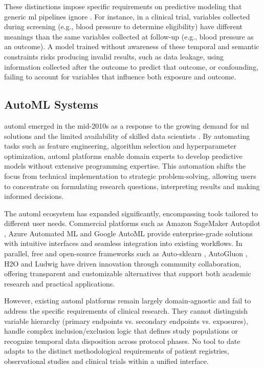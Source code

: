 \documentclass[conference,twocolumn]{IEEEtran}
\begin{document}
These distinctions impose specific requirements on predictive modeling that generic \gls{ml} pipelines ignore \cite{gao2025confounder}. For instance, in a clinical trial, variables collected during screening (e.g., blood pressure to determine eligibility) have different meanings than the same variables collected at follow-up (e.g., blood pressure as an outcome). A model trained without awareness of these temporal and semantic constraints risks producing invalid results, such as data leakage, using information collected after the outcome to predict that outcome, or confounding, failing to account for variables that influence both exposure and outcome.

\subsection{AutoML Systems}  
\label{subsec:automl_systems}  
  
\gls{automl} emerged in the mid-2010s as a response to the growing demand for   
\gls{ml} solutions and the limited availability of skilled data scientists   
\cite{he2021automl}. By automating tasks such as feature engineering, algorithm   
selection and hyperparameter optimization, \gls{automl} platforms enable domain   
experts to develop predictive models without extensive programming expertise. This   
automation shifts the focus from technical implementation to strategic   
problem-solving, allowing users to concentrate on formulating research questions,   
interpreting results and making informed decisions.

The \gls{automl} ecosystem has expanded significantly, encompassing tools tailored   
to different user needs. Commercial platforms such as Amazon SageMaker Autopilot   
\cite{AmazonSagemakerAutopilot}, Azure Automated ML \cite{AzureAutomatedML} and   
Google AutoML \cite{GoogleAutoML} provide enterprise-grade solutions with intuitive   
interfaces and seamless integration into existing workflows. In parallel, free and open-source frameworks such as Auto-sklearn \cite{autosklearn}, AutoGluon \cite{autogluon}, H2O \cite{h2o3} and Ludwig \cite{ludwig} have driven innovation through community collaboration, offering transparent and customizable alternatives that support both academic research and practical applications.  
  
However, existing \gls{automl} platforms remain largely domain-agnostic and fail to   
address the specific requirements of clinical research. They cannot distinguish   
variable hierarchy (primary endpoints vs. secondary endpoints vs. exposures), handle complex inclusion/exclusion logic that defines study populations or recognize temporal data disposition across protocol phases. No tool to date adapts to the   
distinct methodological requirements of patient registries, observational studies and clinical trials within a unified interface.
  
\end{document}
